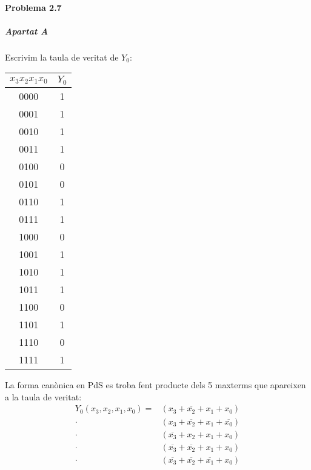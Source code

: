 



\startpage
\paragraph{Problema 2.7} \hspace{0em}

\vspace{1em}


\subparagraph{Apartat A}

Escrivim la taula de veritat de $Y_0$:

\begin{center} \begin{tabular}{cc}
$x_3x_2x_1x_0$ & $Y_0$ \\
\hline
0000 & 1 \\
0001 & 1 \\
0010 & 1 \\
0011 & 1 \\
0100 & 0 \\
0101 & 0 \\
0110 & 1 \\
0111 & 1 \\
1000 & 0 \\
1001 & 1 \\
1010 & 1 \\
1011 & 1 \\
1100 & 0 \\
1101 & 1 \\
1110 & 0 \\
1111 & 1
\end{tabular} \end{center}

La forma canònica en PdS es troba fent producte dels 5 maxterms que apareixen a la taula de veritat:
%
\begin{align*}
  Y_0(x_3,x_2,x_1,x_0) =&
    \left( x_3 + \overline{x_2} + x_1 + x_0 \right) \\ \cdot&
    \left( x_3 + \overline{x_2} + x_1 + \overline{x_0} \right) \\ \cdot&
    \left( \overline{x_3} + x_2 + x_1 + x_0 \right) \\ \cdot&
    \left( \overline{x_3} + \overline{x_2} + x_1 + x_0 \right) \\ \cdot&
    \left( \overline{x_3} + \overline{x_2} + \overline{x_1} + x_0 \right)
\end{align*}


